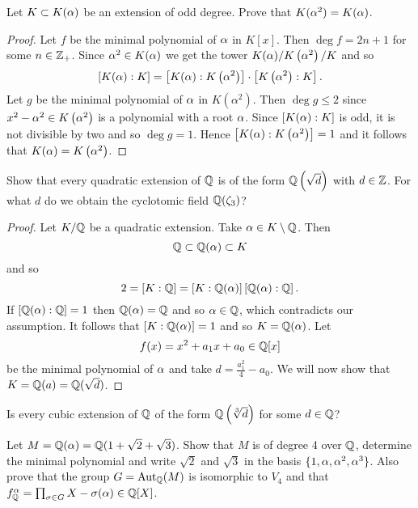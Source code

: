     \begin{ex}{21.19}
        Let $K\subset K(\alpha)$ be an extension of odd degree. Prove that $K(\alpha^2)=K(\alpha)$.
    \end{ex}
    \begin{proof}
        Let $f$ be the minimal polynomial of $\alpha$ in $K[x]$. Then $\deg f=2n+1$ for some $n\in\mathbb{Z}_+$. 
        Since $\alpha^2\in K(\alpha)$ we get the tower $K(\alpha)/K\left(\alpha^2\right)/K$ and so\
        $$ \left[K(\alpha):K\right]=\left[K(\alpha):K\left(\alpha^2\right)\right]\cdot\left[K\left(\alpha^2\right):K\right].$$
        Let $g$ be the minimal polynomial of $\alpha$ in $K\left(\alpha^2\right)$. Then $\deg g\leq 2$ since $x^2-\alpha^2\in K\left(\alpha^2\right)$ is a polynomial with a root $\alpha$.
        Since $\left[K(\alpha):K\right]$ is odd, it is not divisible by two and so $\deg g = 1$. Hence $\left[K(\alpha):K\left(\alpha^2\right)\right]=1$ and it follows that $K(\alpha)=K\left(\alpha^2\right)$.
    \end{proof}

    \begin{ex}{21.23}
        Show that every quadratic extension of $\mathbb{Q}$ is of the form $\mathbb{Q}\left(\sqrt{d}\right)$ with $d\in\mathbb{Z}$.
        For what $d$ do we obtain the cyclotomic field $\mathbb{Q}(\zeta_3)$?
    \end{ex}
    \begin{proof}
        Let $K/\mathbb{Q}$ be a quadratic extension. Take $\alpha\in K\setminus\mathbb{Q}$. Then 
        $$ \mathbb{Q}\subset\mathbb{Q}(\alpha)\subset K $$
        and so
        $$2=\left[K:\mathbb{Q}\right]=\left[K:\mathbb{Q}(\alpha)\right]\left[\mathbb{Q}(\alpha):\mathbb{Q}\right].$$
        If $\left[\mathbb{Q}(\alpha):\mathbb{Q}\right]=1$ then $\mathbb{Q}(\alpha)=\mathbb{Q}$ and so $\alpha\in\mathbb{Q}$, which contradicts our assumption. 
        It follows that $\left[K:\mathbb{Q}(\alpha)\right]=1$ and so $K=\mathbb{Q}(\alpha)$. 
        Let 
        $$f(x)=x^2+a_1 x+a_0\in\mathbb{Q}[x]$$
        be the minimal polynomial of $\alpha$ and take $d=\frac{a_1^2}{4}-a_0$.
        We will now show that $K=\mathbb{Q}(a)=\mathbb{Q}(\sqrt{d})$.
    \end{proof}

    \begin{ex}{21.24}
        Is every cubic extension of $\mathbb{Q}$ of the form $\mathbb{Q}\left(\sqrt[3]{d}\right)$ for some $d\in\mathbb{Q}$?
    \end{ex}

    \begin{ex}{21.26}
        Let $M=\mathbb{Q}(\alpha)=\mathbb{Q}(1+\sqrt{2}+\sqrt{3})$. Show that $M$ is of degree 4 over $\mathbb{Q}$, determine the minimal polynomial and write $\sqrt{2}$ and $\sqrt{3}$ in the basis $\{1,\alpha, \alpha^2,\alpha^3\}$.
        Also prove that the group $G=\text{Aut}_{\mathbb{Q}}(M)$ is isomorphic to $V_4$ and that $f^\alpha_{\mathbb{Q}}=\prod_{\sigma\in G}X-\sigma(\alpha)\in\mathbb{Q}[X]$.
    \end{ex}
    \begin{sol}
        
    \end{sol}

